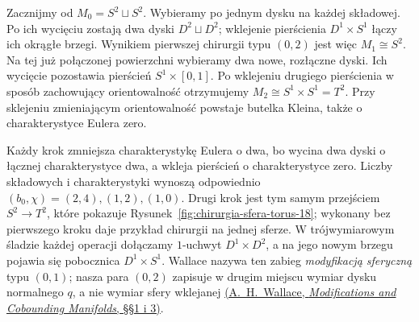 \begin{przyklad}
\label{prz:dwie-sfery-dwa-uchwyty-21}
Zacznijmy od $M_0=S^2\sqcup S^2$. Wybieramy po jednym
dysku na każdej składowej. Po ich wycięciu zostają dwa
dyski $D^2\sqcup D^2$; wklejenie pierścienia
$D^1\times S^1$ łączy ich okrągłe brzegi. Wynikiem
pierwszej chirurgii typu $(0,2)$ jest więc $M_1\cong S^2$.
Na tej już połączonej powierzchni wybieramy dwa nowe,
rozłączne dyski. Ich wycięcie pozostawia pierścień
$S^1\times[0,1]$. Po wklejeniu drugiego pierścienia
w sposób zachowujący orientowalność otrzymujemy
$M_2\cong S^1\times S^1=T^2$.
Przy sklejeniu zmieniającym orientowalność powstaje
butelka Kleina, także o charakterystyce Eulera zero.

Każdy krok zmniejsza charakterystykę Eulera o dwa,
bo wycina dwa dyski o łącznej charakterystyce dwa,
a wkleja pierścień o charakterystyce zero. Liczby
składowych i charakterystyki wynoszą odpowiednio
$(b_0,\chi)=(2,4),(1,2),(1,0)$.
Drugi krok jest tym samym przejściem $S^2\to T^2$,
które pokazuje Rysunek~\ref{fig:chirurgia-sfera-torus-18};
wykonany bez pierwszego kroku daje przykład chirurgii
na jednej sferze. W trójwymiarowym śladzie każdej operacji
dołączamy $1$-uchwyt $D^1\times D^2$, a na jego nowym
brzegu pojawia się pobocznica $D^1\times S^1$.
Wallace nazywa ten zabieg \emph{modyfikacją sferyczną}
typu $(0,1)$; nasza para $(0,2)$ zapisuje w drugim miejscu
wymiar dysku normalnego $q$, a nie wymiar sfery wklejanej
\href{https://doi.org/10.4153/CJM-1960-045-7}
{(A.~H.~Wallace, \emph{Modifications and Cobounding Manifolds},
\S\S1 i 3)}.
\end{przyklad}

